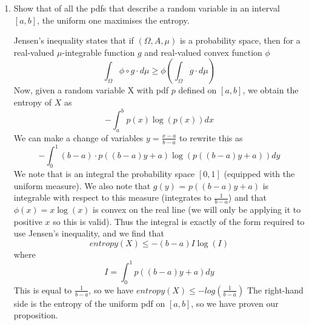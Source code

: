 \documentclass{article}
\newcommand{\chapternumber}{2}
\newenvironment{QandA}{\begin{enumerate}[label=\chapternumber.\arabic*]\bfseries\boldmath}
	{\end{enumerate}}
\newenvironment{answered}{\par\bigskip\normalfont\unboldmath}{}
\begin{document}
\begin{QandA}
	\item Show that of all the pdfs that describe a random variable in an interval $[a,b]$, the uniform one maximises the entropy.
	\begin{answered}
		Jensen's inequality states that if $(\Omega,A,\mu)$ is a probability space, then for a real-valued $\mu$-integrable function $g$ and real-valued convex function $\phi$
		\[\int_\Omega\phi\circ g\cdot d\mu\geq\phi\left(\int_\Omega g\cdot d\mu\right)\]
		Now, given a random variable X with pdf $p$ defined on $[a,b]$, we obtain the entropy of $X$ as
		\[-\int_a^bp(x)\log(p(x))dx\]
		We can make a change of variables $y=\frac{x-a}{b-a}$ to rewrite this as
		\[-\int_0^1(b-a)\cdot p((b-a)y+a)\log(p((b-a)y+a))dy\]
		We note that is an integral the probability space $[0,1]$ (equipped with the uniform measure). We also note that $g(y)$ = $p((b-a)y+a)$ is integrable with respect to this measure (integrates to $\frac{1}{b-a}$) and that $\phi(x)=x\log(x)$ is convex on the real line (we will only be applying it to positive $x$ so this is valid). Thus the integral is exactly of the form required to use Jensen's inequality, and we find that
		\[entropy(X)\leq-(b-a)I\log(I)\]
		where
		\[I=\int_0^1p((b-a)y+a)dy\]
		This is equal to $\frac{1}{b-a}$, so we have
		$entropy(X)\leq -log(\frac{1}{b-a})$
		The right-hand side is the entropy of the uniform pdf on $[a,b]$, so we have proven our proposition.
	\end{answered}
	
	\end{QandA}
\end{document}
